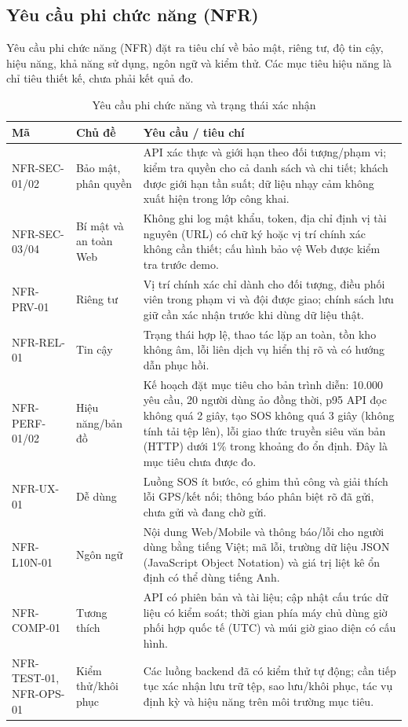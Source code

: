 \documentclass[12pt,a4paper,oneside]{report}
\begin{document}
\subsection{Yêu cầu phi chức năng (NFR)}
Yêu cầu phi chức năng (NFR) đặt ra tiêu chí về bảo mật, riêng tư, độ tin cậy, hiệu năng, khả năng sử dụng, ngôn ngữ và kiểm thử. Các mục tiêu hiệu năng là chỉ tiêu thiết kế, chưa phải kết quả đo.
\begin{table}[htbp]
  \centering
  \caption{Yêu cầu phi chức năng và trạng thái xác nhận}\label{tab:nfr}
  \small
  \begin{tabularx}{\textwidth}{|L{2.5cm}|L{2.5cm}|Y|}
    \hline
    \centering\textbf{Mã} & \centering\textbf{Chủ đề} & \centering\arraybackslash\textbf{Yêu cầu / tiêu chí} \\
    \hline
    NFR-SEC-01/02 & Bảo mật, phân quyền & API xác thực và giới hạn theo đối tượng/phạm vi; kiểm tra quyền cho cả danh sách và chi tiết; khách được giới hạn tần suất; dữ liệu nhạy cảm không xuất hiện trong lớp công khai. \\
    \hline
    NFR-SEC-03/04 & Bí mật và an toàn Web & Không ghi log mật khẩu, token, địa chỉ định vị tài nguyên (URL) có chữ ký hoặc vị trí chính xác không cần thiết; cấu hình bảo vệ Web được kiểm tra trước demo. \\
    \hline
    NFR-PRV-01 & Riêng tư & Vị trí chính xác chỉ dành cho đối tượng, điều phối viên trong phạm vi và đội được giao; chính sách lưu giữ cần xác nhận trước khi dùng dữ liệu thật. \\
    \hline
    NFR-REL-01 & Tin cậy & Trạng thái hợp lệ, thao tác lặp an toàn, tồn kho không âm, lỗi liên dịch vụ hiển thị rõ và có hướng dẫn phục hồi. \\
    \hline
    NFR-PERF-01/02 & Hiệu năng/bản đồ & Kế hoạch đặt mục tiêu cho bản trình diễn: 10.000 yêu cầu, 20 người dùng ảo đồng thời, p95 API đọc không quá 2 giây, tạo SOS không quá 3 giây (không tính tải tệp lên), lỗi giao thức truyền siêu văn bản (HTTP) dưới 1\% trong khoảng đo ổn định. Đây là mục tiêu chưa được đo. \\
    \hline
    NFR-UX-01 & Dễ dùng & Luồng SOS ít bước, có ghim thủ công và giải thích lỗi GPS/kết nối; thông báo phân biệt rõ đã gửi, chưa gửi và đang chờ gửi. \\
    \hline
    NFR-L10N-01 & Ngôn ngữ & Nội dung Web/Mobile và thông báo/lỗi cho người dùng bằng tiếng Việt; mã lỗi, trường dữ liệu JSON (JavaScript Object Notation) và giá trị liệt kê ổn định có thể dùng tiếng Anh. \\
    \hline
    NFR-COMP-01 & Tương thích & API có phiên bản và tài liệu; cập nhật cấu trúc dữ liệu có kiểm soát; thời gian phía máy chủ dùng giờ phối hợp quốc tế (UTC) và múi giờ giao diện có cấu hình. \\
    \hline
    NFR-TEST-01, NFR-OPS-01 & Kiểm thử/khôi phục & Các luồng backend đã có kiểm thử tự động; cần tiếp tục xác nhận lưu trữ tệp, sao lưu/khôi phục, tác vụ định kỳ và hiệu năng trên môi trường mục tiêu. \\
    \hline
  \end{tabularx}
\end{table}
\end{document}
